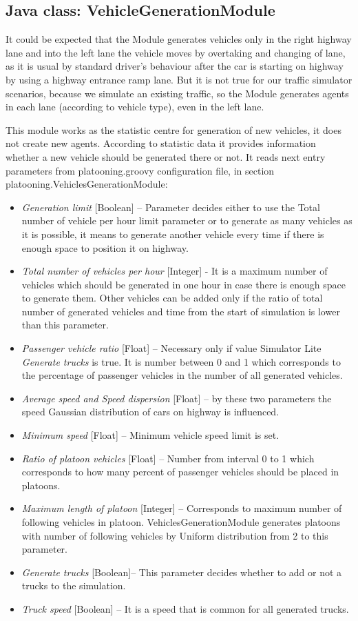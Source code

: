 \subsection{Java class: VehicleGenerationModule}

It could be expected that the Module generates vehicles only in the right highway lane and into the left lane the vehicle moves by overtaking and changing of lane, as it is usual by standard driver’s behaviour after the car is starting on highway by using a highway entrance ramp lane. But it is not true for our traffic simulator scenarios, because we simulate an existing traffic, so the Module generates agents in each  lane (according to vehicle type), even in the left lane.

This module works as the statistic centre for generation of new vehicles, it does not create new agents. According to statistic data it provides information whether a new vehicle should be generated there or not. It reads next entry parameters from platooning.groovy configuration file, in section platooning.VehiclesGenerationModule:

\begin{itemize}
\item	\textit{Generation limit} [Boolean] – Parameter decides either to use the Total number of vehicle per hour limit parameter or to generate as many vehicles as it is possible, it means to  generate another vehicle every time if  there is enough space to position it on highway.
\item	\textit{Total number of vehicles per hour} [Integer] - It is a maximum number of vehicles which should be generated in one hour in case there is enough space to generate them. Other vehicles can be added only if the ratio of total number of generated vehicles and time from the start of simulation is lower than this parameter.  
\item \textit{Passenger vehicle ratio} [Float] – Necessary only if value Simulator Lite \textit{Generate trucks} is true. It is number between 0 and 1 which corresponds to the percentage of passenger vehicles in  the number of all generated vehicles.
\item \textit{Average speed and Speed dispersion} [Float] – by these two parameters the speed Gaussian distribution of cars on highway is influenced.
\item \textit{Minimum speed} [Float] – Minimum vehicle speed limit is set.
\item \textit{Ratio of platoon vehicles} [Float] – Number from interval 0 to 1 which corresponds to how many percent of passenger vehicles should be placed in platoons.
\item \textit{Maximum length of platoon} [Integer] – Corresponds to maximum number of following vehicles in platoon. VehiclesGenerationModule generates platoons with number of following vehicles by Uniform distribution from 2 to this parameter.
\item \textit{Generate trucks} [Boolean]– This parameter decides whether to add or not a trucks to the simulation.
\item \textit{Truck speed} [Boolean] – It is a speed that is common for all generated trucks.
\end{itemize}


